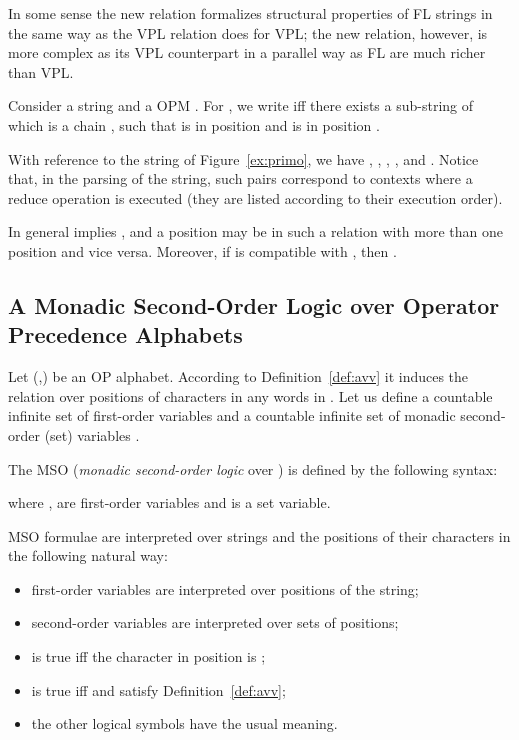 \documentclass[10pt,a4paper,runningheads]{llncs}
\begin{document}
In some sense the new relation formalizes structural properties of FL
strings in the same way as the VPL   relation does for VPL; the new
relation, however, is more complex as its VPL counterpart in a
parallel way as FL are much richer than VPL.

\begin{definition} 
\label{def:avv}
Consider a string  and a OPM .  For , we write  iff there exists a sub-string of  which is a chain ,
such that  is in position  and  is in position
.
\end{definition}

\begin{example}
  With reference to the string of Figure~\ref{ex:primo}, we have , , , , and .  Notice
  that, in the parsing of the string, such pairs correspond to
  contexts where a reduce operation is executed (they are listed
  according to their execution order).
\end{example}
In general  implies , and a position  may be in
such a relation with more than one position and vice versa.  Moreover,
if  is compatible with , then .



\subsection{A Monadic Second-Order Logic over Operator Precedence Alphabets}

Let (,) be an OP alphabet. According to Definition~\ref{def:avv} it induces the relation
 over positions of characters in any words in .  Let us define a countable infinite set
of first-order variables  and a countable infinite set of
monadic second-order (set) variables .





\begin{definition}
	The MSO (\emph{monadic second-order logic} over ) is defined by the following syntax:

where ,  are first-order variables and  is a set variable.
\end{definition}

MSO formulae are interpreted over  strings and the positions of their characters in the following natural way: 
\begin{itemize}
\item
first-order variables are interpreted over positions of the string; 
\item
second-order variables are interpreted over sets of positions;
\item
 is true iff the character in position  is ;
\item
 is true iff  and  satisfy Definition~\ref{def:avv};
\item
the other logical symbols have the usual meaning.
\end{itemize}
\end{document}
